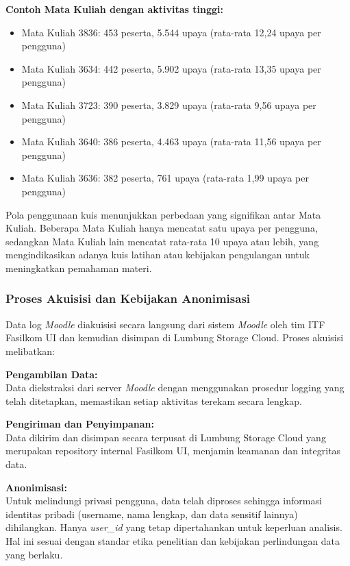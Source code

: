 \textbf{Contoh Mata Kuliah dengan aktivitas tinggi:}
\begin{itemize}
    \item Mata Kuliah 3836: 453 peserta, 5.544 upaya (rata-rata 12,24 upaya per pengguna)
    \item Mata Kuliah 3634: 442 peserta, 5.902 upaya (rata-rata 13,35 upaya per pengguna)
    \item Mata Kuliah 3723: 390 peserta, 3.829 upaya (rata-rata 9,56 upaya per pengguna)
    \item Mata Kuliah 3640: 386 peserta, 4.463 upaya (rata-rata 11,56 upaya per pengguna)
    \item Mata Kuliah 3636: 382 peserta, 761 upaya (rata-rata 1,99 upaya per pengguna)
\end{itemize}

Pola penggunaan kuis menunjukkan perbedaan yang signifikan antar Mata Kuliah. Beberapa Mata Kuliah hanya mencatat satu upaya per pengguna, sedangkan Mata Kuliah lain mencatat rata-rata 10 upaya atau lebih, yang mengindikasikan adanya kuis latihan atau kebijakan pengulangan untuk meningkatkan pemahaman materi.

\subsubsection{Proses Akuisisi dan Kebijakan Anonimisasi}
\label{sec:prosesAkuisisiKebijakanAnonimisasi}
Data log \textit{Moodle} diakuisisi secara langsung dari sistem \textit{Moodle} oleh tim ITF Fasilkom UI dan kemudian disimpan di Lumbung Storage Cloud. Proses akuisisi melibatkan:

\textbf{Pengambilan Data:} \\
Data diekstraksi dari server \textit{Moodle} dengan menggunakan prosedur logging yang telah ditetapkan, memastikan setiap aktivitas terekam secara lengkap.

\textbf{Pengiriman dan Penyimpanan:} \\
Data dikirim dan disimpan secara terpusat di Lumbung Storage Cloud yang merupakan repository internal Fasilkom UI, menjamin keamanan dan integritas data.

\textbf{Anonimisasi:} \\
Untuk melindungi privasi pengguna, data telah diproses sehingga informasi identitas pribadi (username, nama lengkap, dan data sensitif lainnya) dihilangkan. Hanya \textit{user\_id} yang tetap dipertahankan untuk keperluan analisis. Hal ini sesuai dengan standar etika penelitian dan kebijakan perlindungan data yang berlaku.


